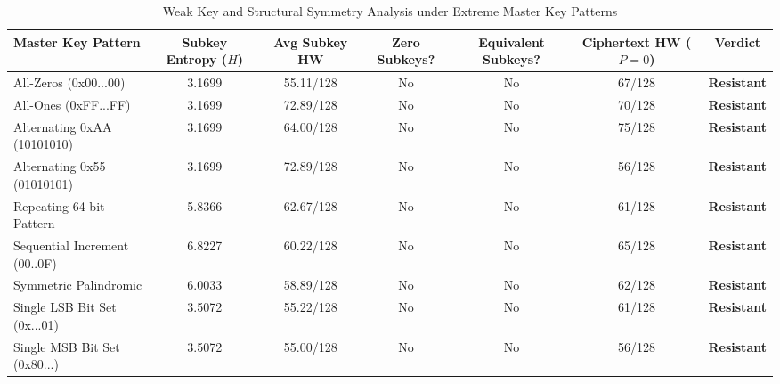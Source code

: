 \begin{table}[htbp]
\caption{Weak Key and Structural Symmetry Analysis under Extreme Master Key Patterns}
\label{tab:weak_key_analysis}
\centering
\small
\begin{tabular}{@{}lcccccc@{}}
\toprule
\textbf{Master Key Pattern} & \textbf{Subkey Entropy ($H$)} & \textbf{Avg Subkey HW} & \textbf{Zero Subkeys?} & \textbf{Equivalent Subkeys?} & \textbf{Ciphertext HW ($P=0$)} & \textbf{Verdict} \\ \midrule
All-Zeros (0x00...00) & 3.1699 & 55.11/128 & No & No & 67/128 & \textbf{Resistant} \\
All-Ones (0xFF...FF) & 3.1699 & 72.89/128 & No & No & 70/128 & \textbf{Resistant} \\
Alternating 0xAA (10101010) & 3.1699 & 64.00/128 & No & No & 75/128 & \textbf{Resistant} \\
Alternating 0x55 (01010101) & 3.1699 & 72.89/128 & No & No & 56/128 & \textbf{Resistant} \\
Repeating 64-bit Pattern & 5.8366 & 62.67/128 & No & No & 61/128 & \textbf{Resistant} \\
Sequential Increment (00..0F) & 6.8227 & 60.22/128 & No & No & 65/128 & \textbf{Resistant} \\
Symmetric Palindromic & 6.0033 & 58.89/128 & No & No & 62/128 & \textbf{Resistant} \\
Single LSB Bit Set (0x...01) & 3.5072 & 55.22/128 & No & No & 61/128 & \textbf{Resistant} \\
Single MSB Bit Set (0x80...) & 3.5072 & 55.00/128 & No & No & 56/128 & \textbf{Resistant} \\
\bottomrule
\end{tabular}
\end{table}

